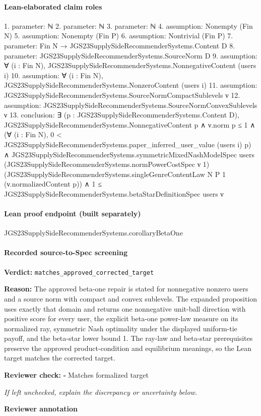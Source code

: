 \documentclass[10pt]{article}
\newcommand{\reviewerbox}{%
  \par\noindent\fbox{\parbox{0.96\linewidth}{\rule{0pt}{0.38in}}}\par
}
\newcommand{\reviewmatch}[1]{%
  \par\noindent\textbf{Reviewer check:} $\square$\; #1\par
  \noindent\emph{If left unchecked, explain the discrepancy or uncertainty below.}\par
}
\begin{document}
\paragraph{Lean-elaborated claim roles}\begin{ReviewVerbatim}
1. parameter: ℕ
2. parameter: ℕ
3. parameter: ℕ
4. assumption: Nonempty (Fin N)
5. assumption: Nonempty (Fin P)
6. assumption: Nontrivial (Fin P)
7. parameter: Fin N → JGS23SupplySideRecommenderSystems.Content D
8. parameter: JGS23SupplySideRecommenderSystems.SourceNorm D
9. assumption: ∀ (i : Fin N), JGS23SupplySideRecommenderSystems.NonnegativeContent (users i)
10. assumption: ∀ (i : Fin N), JGS23SupplySideRecommenderSystems.NonzeroContent (users i)
11. assumption: JGS23SupplySideRecommenderSystems.SourceNormCompactSublevels ν
12. assumption: JGS23SupplySideRecommenderSystems.SourceNormConvexSublevels ν
13. conclusion: ∃ (p : JGS23SupplySideRecommenderSystems.Content D),
  JGS23SupplySideRecommenderSystems.NonnegativeContent p ∧
    ν.norm p ≤ 1 ∧
      (∀ (i : Fin N), 0 < JGS23SupplySideRecommenderSystems.paper_inferred_user_value (users i) p) ∧
        JGS23SupplySideRecommenderSystems.symmetricMixedNashModelSpec users
            (JGS23SupplySideRecommenderSystems.normPowerCostSpec ν 1)
            (JGS23SupplySideRecommenderSystems.singleGenreContentLaw N P 1 (ν.normalizedContent p)) ∧
          1 ≤ JGS23SupplySideRecommenderSystems.betaStarDefinitionSpec users ν
\end{ReviewVerbatim}

\paragraph{Lean proof endpoint (built separately)}\begin{ReviewVerbatim}
JGS23SupplySideRecommenderSystems.corollaryBetaOne
\end{ReviewVerbatim}

\paragraph{Recorded source-to-Spec screening}
\textbf{Verdict:} \texttt{matches\_approved\_corrected\_target}
\\
{\raggedright
\textbf{Reason:} The approved beta-\allowbreak{}one repair is stated for nonnegative nonzero users and a source norm with compact and convex sublevels.\allowbreak{} The expanded proposition uses exactly that domain and returns one nonnegative unit-\allowbreak{}ball direction with positive score for every user, the explicit beta-\allowbreak{}one power-\allowbreak{}law measure on its normalized ray, symmetric Nash optimality under the displayed uniform-\allowbreak{}tie payoff, and the beta-\allowbreak{}star lower bound 1.\allowbreak{} The ray-\allowbreak{}law and beta-\allowbreak{}star prerequisites preserve the approved product-\allowbreak{}condition and equilibrium meanings, so the Lean target matches the corrected target.\allowbreak{}
\par}
\reviewmatch{Matches formalized target}
\noindent\textbf{Reviewer annotation}\par
\reviewerbox
\clearpage
\hypertarget{source-claim-50393bc34777b8a7}{}
\end{document}
